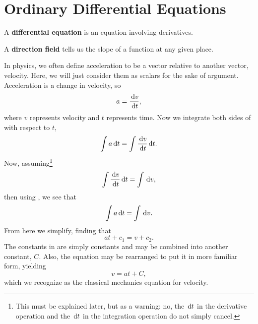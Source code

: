 \chapter{Ordinary Differential Equations}
\begin{defn}
  A \textbf{differential equation} is an equation involving derivatives.
\end{defn}
\begin{defn}
  A \textbf{direction field} tells us the slope of a function at any given place.
\end{defn}
\begin{ex}
    In physics, we often define acceleration to be a vector relative to another 
    vector, velocity.
    Here, we will just consider them as scalars for the sake of argument.
    Acceleration is a change in velocity, so
    \begin{equation}
        a = \frac{\,\mathrm{d} v}{\,\mathrm{d} t},
        \label{eq:acceleration}
    \end{equation}
    where $v$ represents velocity and $t$ represents time.
    Now we integrate both sides of  with respect to $t$,
    \begin{equation}
        \int a \,\mathrm{d} t = \int \frac{\,\mathrm{d} v}{\,\mathrm{d} t} \,\mathrm{d} t.
        \label{eq:intaccel}
    \end{equation}
    Now, assuming\footnote{This must be explained later, but as a warning: no,
    the $\,\mathrm{d} t$ in the derivative operation and the $\,\mathrm{d} t$ in the integration 
    operation do not simply cancel.}
    \begin{equation}
        \int \frac{\,\mathrm{d} v}{\,\mathrm{d} t} \,\mathrm{d} t = \int \,\mathrm{d} v,
        \label{eq:handwave}
    \end{equation}
    then using , we see that
    \begin{equation}
        \int a \,\mathrm{d} t = \int \,\mathrm{d} v.
        \label{eq:naughtint}
    \end{equation}
    From here we simplify, finding that
    \begin{equation}
        at + c_1 = v + c_2.
        \label{eq:almostvelocity}
    \end{equation}
    The constants in  are simply constants and may be combined into another constant, $C$.
    Also, the equation may be rearranged to put it in more familiar form, yielding
    \begin{equation}
        v = at + C,
        \label{eq:velocity}
    \end{equation}
    which we recognize as the classical mechanics equation for velocity.

\end{ex}
